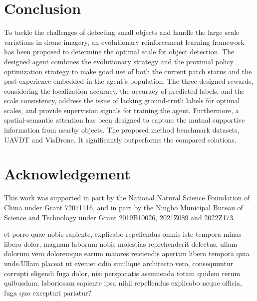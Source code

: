\documentclass[letterpaper]{article} %
\begin{document}
\section{Conclusion}
\label{sec: conclusion}
To tackle the challenges of detecting small objects and handle the large scale variations in drone imagery, an evolutionary reinforcement learning framework %
has been proposed to determine the optimal scale for object detection. %
The designed agent combines the evolutionary strategy and the proximal policy optimization strategy to make good use of both the current patch status and the past experience embedded in the agent's population. The three designed rewards, considering the localization accuracy, the accuracy of predicted labels, and the scale consistency, address the issue of lacking ground-truth labels for optimal scales, and provide supervision signals for training the agent. Furthermore, a spatial-semantic attention %
has been designed to capture the mutual supportive information from nearby objects. The proposed method %
 benchmark datasets, UAVDT and VisDrone. It significantly outperforms the compared solutions. %


\section{Acknowledgement}
This work was supported in part by the National Natural Science Foundation of China under Grant 72071116, and in part by the Ningbo Municipal Bureau of Science and Technology under Grant 2019B10026, 2021Z089 and 2022Z173.

 et porro quae nobis sapiente, explicabo repellendus omnis iste tempora minus libero dolor, magnam laborum nobis molestias reprehenderit delectus, ullam dolorum vero doloremque earum maiores reiciendis aperiam libero tempora quia unde.Ullam placeat ut eveniet odio similique architecto vero, consequuntur corrupti eligendi fuga dolor, nisi perspiciatis assumenda totam quidem rerum quibusdam, laboriosam sapiente ipsa nihil repellendus explicabo neque officia, fuga quo excepturi pariatur?\clearpage

\end{document}
